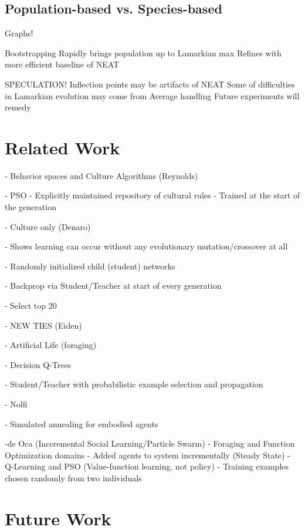 \documentclass{acm_proc_article-sp}
\begin{document}
\subsection*{Population-based vs. Species-based}

Graphs!

Bootstrapping
    Rapidly brings population up to Lamarkian max
    Refines with more efficient baseline of NEAT
    
SPECULATION!
    Inflection points may be artifacts of NEAT
    Some of difficulties in Lamarkian evolution may come from Average handling
    Future experiments will remedy

\section{Related Work}
\label{sec:related}

- Behavior spaces and Culture Algorithms (Reynolds)

    - PSO
    - Explicitly maintained repository of cultural rules
    - Trained at the start of the generation
    
    
- Culture only (Denaro)

    - Shows learning can occur without any evolutionary mutation/crossover at all
    
    - Randomly initialized child (student) networks
    
    - Backprop via Student/Teacher at start of every generation
    
    - Select top 20%
    
- NEW TIES (Eiden)

    - Artificial Life (foraging)
    
    - Decision Q-Trees
    
    - Student/Teacher with probabilistic example selection and propagation
    
- Nolfi

    - Simulated annealing for embodied agents
    
-de Oca (Inceremental Social Learning/Particle Swarm)
    - Foraging and Function Optimization domains
    - Added agents to system incrementally (Steady State)
    - Q-Learning and PSO (Value-function learning, not policy)
    - Training examples chosen randomly from two individuals


\section{Future Work}
\label{sec:future}
\end{document}
